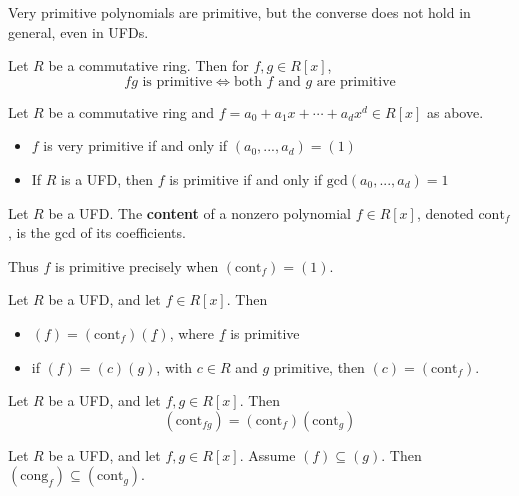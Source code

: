 \documentclass[12pt, a4paper, oneside, openright, titlepage]{book}
\begin{document}
Very primitive polynomials are primitive, but the converse does not hold in general, even in UFDs.

\begin{lem}
    Let $R$ be a commutative ring. Then for $f,g \in R[x]$, $$fg\text{ is primitive}\iff\text{both $f$ and $g$ are primitive}$$
\end{lem}

\begin{lem}
    Let $R$ be a commutative ring and $f = a_0+a_1x+\cdots+a_dx^d \in R[x]$ as above. \begin{itemize}
        \item $f$ is very primitive if and only if $(a_0,...,a_d) = (1)$
        \item If $R$ is a UFD, then $f$ is primitive if and only if $\text{gcd}(a_0,...,a_d) = 1$
    \end{itemize}
\end{lem}

\begin{defn}
    Let $R$ be a UFD. The \textbf{content} of a nonzero polynomial $f \in R[x]$, denoted $\text{cont}_f$, is the gcd of its coefficients.
\end{defn}

Thus $f$ is primitive precisely when $(\text{cont}_f) = (1)$.

\begin{lem}
    Let $R$ be a UFD, and let $f \in R[x]$. Then \begin{itemize}
        \item $(f) = (\text{cont}_f)(\underline{f})$, where $\underline{f}$ is primitive
        \item if $(f) = (c)(g)$, with $c \in R$ and $g$ primitive, then $(c) = (\text{cont}_f)$.
    \end{itemize}
\end{lem}

\begin{prop}
    Let $R$ be a UFD, and let $f,g \in R[x]$. Then \begin{equation*}
        (\text{cont}_{fg}) = (\text{cont}_f)(\text{cont}_g)
    \end{equation*}
\end{prop}

\begin{cor}
    Let $R$ be a UFD, and let $f,g \in R[x]$. Assume $(f) \subseteq (g)$. Then $(\text{cong}_f) \subseteq (\text{cont}_g)$.
\end{cor}
\end{document}
